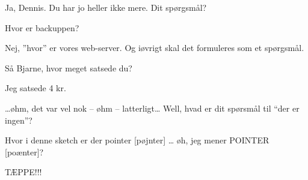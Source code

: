 \documentclass[danish]{article}
\begin{document}
\begin{sketch}
 Ja, Dennis. Du har jo heller ikke mere. Dit spørgsmål?

 Hvor er backuppen?

 Nej, ''hvor'' er vores web-server.  Og iøvrigt skal det formuleres som et spørgsmål.

Så Bjarne, hvor meget satsede du?

 Jeg satsede 4 kr.

 \ldots{}øhm, det var vel nok -- øhm -- latterligt\ldots{}
Well, hvad er dit spørsmål til ``der er ingen''?

 Hvor i denne sketch er der pointer [pøjnter] \ldots{} øh, jeg mener POINTER [poænter]?

\scene TÆPPE!!!

\end{sketch}
\end{document}
